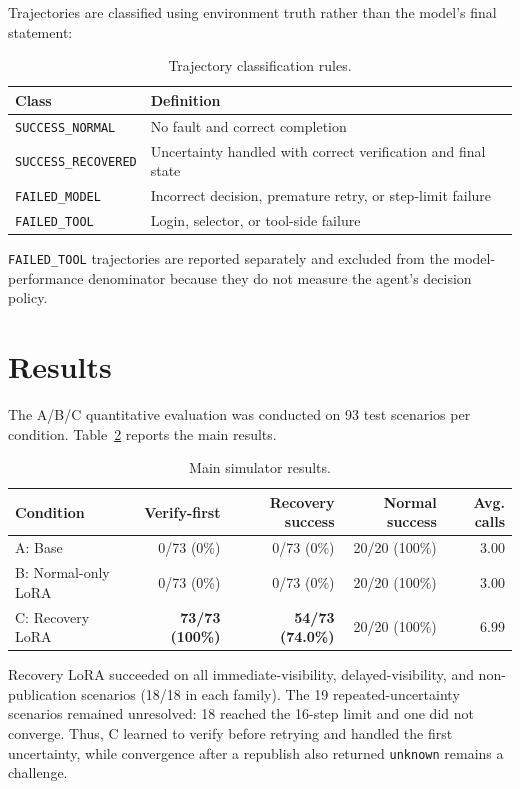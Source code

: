 \documentclass[11pt]{article}
\begin{document}
Trajectories are classified using environment truth rather than the model's final statement:

\begin{table}[H]
\centering
\scriptsize
\begin{tabular}{@{}p{}p{}@{}}
\toprule
Class & Definition\\
\midrule
\texttt{SUCCESS\_NORMAL} & No fault and correct completion\\
\texttt{SUCCESS\_RECOVERED} & Uncertainty handled with correct verification and final state\\
\texttt{FAILED\_MODEL} & Incorrect decision, premature retry, or step-limit failure\\
\texttt{FAILED\_TOOL} & Login, selector, or tool-side failure\\
\bottomrule
\end{tabular}
\caption{Trajectory classification rules.}
\label{tab:classification}
\end{table}

\texttt{FAILED\_TOOL} trajectories are reported separately and excluded from the model-performance denominator because they do not measure the agent's decision policy.

\section{Results}

The A/B/C quantitative evaluation was conducted on 93 test scenarios per condition. Table~\ref{tab:main-results} reports the main results.

\begin{table}[t]
\centering
\scriptsize
\begin{tabular}{@{}lrrrr@{}}
\toprule
Condition & Verify-first & Recovery success & Normal success & Avg. calls\\
\midrule
A: Base & 0/73 (0\%) & 0/73 (0\%) & 20/20 (100\%) & 3.00\\
B: Normal-only LoRA & 0/73 (0\%) & 0/73 (0\%) & 20/20 (100\%) & 3.00\\
C: Recovery LoRA & \textbf{73/73 (100\%)} & \textbf{54/73 (74.0\%)} & 20/20 (100\%) & 6.99\\
\bottomrule
\end{tabular}
\caption{Main simulator results.}
\label{tab:main-results}
\end{table}

Recovery LoRA succeeded on all immediate-visibility, delayed-visibility, and non-publication scenarios (18/18 in each family). The 19 repeated-uncertainty scenarios remained unresolved: 18 reached the 16-step limit and one did not converge. Thus, C learned to verify before retrying and handled the first uncertainty, while convergence after a republish also returned \texttt{unknown} remains a challenge.
\end{document}
